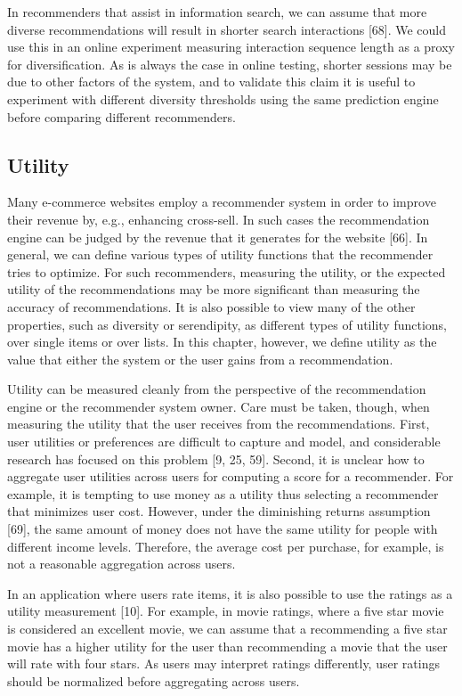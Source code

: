 In recommenders that assist in information search, we can assume that more diverse recommendations will result in shorter search interactions [68]. We could use this in an online experiment measuring interaction sequence length as a proxy for diversification. As is always the case in online testing, shorter sessions may be due to other factors of the system, and to validate this claim it is useful to experiment with different diversity thresholds using the same prediction engine before comparing different recommenders.

\subsection{Utility}

Many e-commerce websites employ a recommender system in order to improve their revenue by, e.g., enhancing cross-sell. In such cases the recommendation engine can be judged by the revenue that it generates for the website [66]. In general, we can define various types of utility functions that the recommender tries to optimize. For such recommenders, measuring the utility, or the expected utility of the recommendations may be more significant than measuring the accuracy of recommendations. It is also possible to view many of the other properties, such as diversity or serendipity, as different types of utility functions, over single items or over lists. In this chapter, however, we define utility as the value that either the system or the user gains from a recommendation.

Utility can be measured cleanly from the perspective of the recommendation engine or the recommender system owner. Care must be taken, though, when measuring the utility that the user receives from the recommendations. First, user utilities or preferences are difficult to capture and model, and considerable research has focused on this problem [9, 25, 59]. Second, it is unclear how to aggregate user utilities across users for computing a score for a recommender. For example, it is tempting to use money as a utility thus selecting a recommender that minimizes user cost. However, under the diminishing returns assumption [69], the same amount of money does not have the same utility for people with different income levels. Therefore, the average cost per purchase, for example, is not a reasonable aggregation across users.

In an application where users rate items, it is also possible to use the ratings as a utility measurement [10]. For example, in movie ratings, where a five star movie is considered an excellent movie, we can assume that a recommending a five star movie has a higher utility for the user than recommending a movie that the user will rate with four stars. As users may interpret ratings differently, user ratings should be normalized before aggregating across users.

